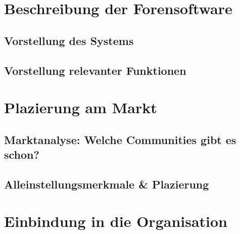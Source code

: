 \section{Beschreibung der Forensoftware} %
\label{sec:beschreibung_der_forensoftware}

\subsection{Vorstellung des Systems} %
\label{sub:vorstellung_des_systems}


\subsection{Vorstellung relevanter Funktionen} %
\label{sub:vorstellung_relevanter_funktionen}



\section{Plazierung am Markt} %
\label{sec:plazierung_am_markt}

\subsection{Marktanalyse: Welche Communities gibt es schon?} %
\label{sub:marktanalyse_welche_communities_gibt_es_schon}


\subsection{Alleinstellungsmerkmale \& Plazierung} %
\label{sub:alleinstellungsmerkmale_plazierung}



\section{Einbindung in die Organisation} %
\label{sec:einbindung_in_die_organisation}

